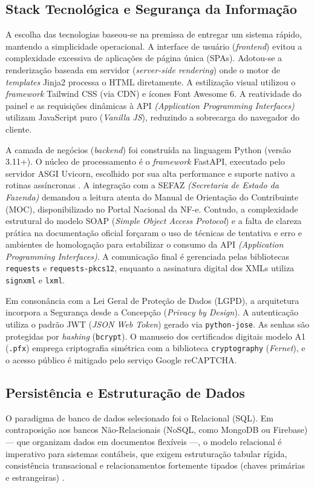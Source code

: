 \documentclass[12pt]{article}
\begin{document}
\subsection{Stack Tecnológica e Segurança da Informação}
A escolha das tecnologias baseou-se na premissa de entregar um sistema rápido, mantendo a simplicidade operacional. A interface de usuário (\textit{frontend}) evitou a complexidade excessiva de aplicações de página única (SPAs). Adotou-se a renderização baseada em servidor (\textit{server-side rendering}) onde o motor de \textit{templates} Jinja2 processa o HTML diretamente. A estilização visual utilizou o \textit{framework} Tailwind CSS (via CDN) e ícones Font Awesome 6. A reatividade do painel e as requisições dinâmicas à API \textit{(Application Programming Interfaces)} utilizam JavaScript puro (\textit{Vanilla JS}), reduzindo a sobrecarga do navegador do cliente.

A camada de negócios (\textit{backend}) foi construída na linguagem Python (versão 3.11+). O núcleo de processamento é o \textit{framework} FastAPI, executado pelo servidor ASGI Uvicorn, escolhido por sua alta performance e suporte nativo a rotinas assíncronas \cite{pressman2016}. A integração com a SEFAZ \textit{(Secretaria de Estado da Fazenda)} demandou a leitura atenta do Manual de Orientação do Contribuinte (MOC), disponibilizado no Portal Nacional da NF-e. Contudo, a complexidade estrutural do modelo SOAP (\textit{Simple Object Access Protocol}) e a falta de clareza prática na documentação oficial forçaram o uso de técnicas de tentativa e erro e ambientes de homologação para estabilizar o consumo da API \textit{(Application Programming Interfaces)}. A comunicação final é gerenciada pelas bibliotecas \texttt{requests} e \texttt{requests-pkcs12}, enquanto a assinatura digital dos XMLs utiliza \texttt{signxml} e \texttt{lxml}.

Em consonância com a Lei Geral de Proteção de Dados (LGPD), a arquitetura incorpora a Segurança desde a Concepção (\textit{Privacy by Design}). A autenticação utiliza o padrão JWT (\textit{JSON Web Token}) gerado via \texttt{python-jose}. As senhas são protegidas por \textit{hashing} (\texttt{bcrypt}). O manuseio dos certificados digitais modelo A1 (\texttt{.pfx}) emprega criptografia simétrica com a biblioteca \texttt{cryptography} (\textit{Fernet}), e o acesso público é mitigado pelo serviço Google reCAPTCHA.

\subsection{Persistência e Estruturação de Dados}
O paradigma de banco de dados selecionado foi o Relacional (SQL). Em contraposição aos bancos Não-Relacionais (NoSQL, como MongoDB ou Firebase) — que organizam dados em documentos flexíveis —, o modelo relacional é imperativo para sistemas contábeis, que exigem estruturação tabular rígida, consistência transacional e relacionamentos fortemente tipados (chaves primárias e estrangeiras) \cite{laudon2014}. 
\end{document}
